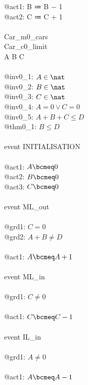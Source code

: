 \begin{description}
\begin{center}
\begin{Bcode}
			@act1: B ≔ B − 1\\
			@act2: C ≔ C + 1\\
			\Bend\\
			\Bend
			\else
			\Bmachine{} Car\_m0_cars\\
			\Bsees{} Car\_c0_limit\\
			\Bvariables{} A B C\\
			\Binvariants\\
			\Btab @inv0_1: \(A \in \nat\)\\
			\Btab @inv0_2: \(B \in \nat\)\\
			\Btab @inv0_3: \(C \in \nat\)\\
			\Btab @inv0_4: \(A = 0 \vee C = 0\)\\
			\Btab @inv0_5: \(A + B + C \leq D\)\\
			\Btab  \Btheorem{} @thm0_1: \(B \leq D\)\\
			\Bevents\\
			\Btab event INITIALISATION\\
			\Btab \Bthen\\
			\Btab \Btab @act1: \(A \bcmeq 0\)\\
			\Btab \Btab @act2: \(B \bcmeq 0\)\\
			\Btab \Btab @act3: \(C \bcmeq 0\)\\
			\Btab \Bend\\
			\Btab event ML_out\\
			\Btab \Bwhere\\
			\Btab \Btab @grd1: \(C = 0\)\\
			\Btab \Btab @grd2: \(A + B \neq D\)\\
			\Btab \Bthen\\
			\Btab \Btab @act1: \(A \bcmeq A + 1\)\\
			\Btab \Bend\\
			\Btab event ML_in\\
			\Btab \Bwhere\\
			\Btab \Btab @grd1: \(C \neq 0\)\\
			\Btab \Bthen\\
			\Btab \Btab @act1: \(C \bcmeq C - 1\)\\
			\Btab \Bend\\
			\Btab event IL_in\\
			\Btab \Bwhere\\
			\Btab \Btab @grd1: \(A \neq 0\)\\
			\Btab \Bthen\\
			\Btab \Btab @act1: \(A \bcmeq A - 1\)\\

\end{Bcode}
\end{center}
\end{description}
